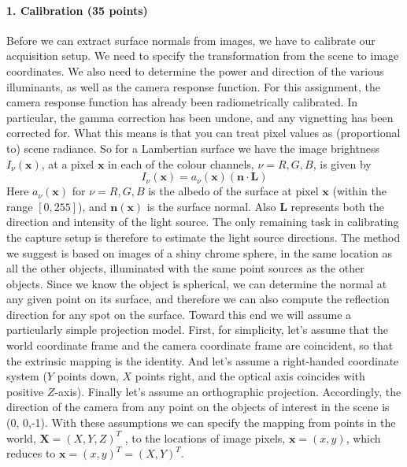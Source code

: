 \documentclass{paper}
\begin{document}
\paragraph{1. Calibration (35 points)}Before we can extract surface normals from images, we have to calibrate our acquisition setup. We need to specify the transformation from the scene to image coordinates. We also need to determine the power and direction of the various illuminants, as well as the camera response function.
For this assignment, the camera response function has already been radiometrically calibrated. In particular, the gamma correction has been undone, and any vignetting has been corrected for. What this means is that you can treat pixel values as (proportional to) scene radiance. So for a Lambertian surface we have the image brightness $I_\nu(\textbf{x})$, at a pixel $\textbf{x}$ in each of the colour channels, $\nu = R,G,B$, is given by
\begin{equation}\label{eq:rgb_model}
I_\nu(\textbf{x})=a_\nu(\textbf{x})(\mathbf{n}\cdot\mathbf{L})
\end{equation}
Here $a_\nu(\textbf{x})$ for $\nu=R,G,B$ is the albedo of the surface at pixel $\textbf{x}$ (within the range $[0,255]$), and $\mathbf{n}(\textbf{x})$ is the surface normal. Also $\mathbf{L}$ represents both the direction and intensity of the light source. 
The only remaining task in calibrating the capture setup is therefore to estimate the light source directions. The method we suggest is based on images of a shiny chrome sphere, in the same location as all the other objects, illuminated with the same point sources as the other objects. Since we know the object is spherical, we can determine the normal at any given point on its surface, and therefore we can also compute the reflection direction for any spot on the surface.
Toward this end we will assume a particularly simple projection model. First, for simplicity, let's assume that the world coordinate frame and the camera coordinate frame are coincident, so that the extrinsic mapping is the identity. And let's assume a right-handed coordinate system ($Y$ points down, $X$ points right, and the optical axis coincides with positive $Z$-axis). Finally let's assume an orthographic projection. Accordingly, the direction of the camera from any point on the objects of interest in the scene is (0, 0,-1).
With these assumptions we can specify the mapping from points in the world, $\textbf{X} =(X,Y,Z)^T$ , to the locations of image pixels, $\textbf{x}=(x,y)$, which reduces to $\textbf{x} =(x, y)^T = (X,Y )^T$.\newline
\end{document}
